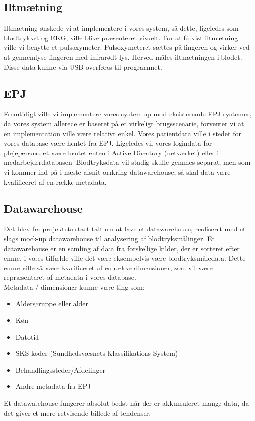 \subsection{Iltmætning}
Iltmætning ønskede vi at implementere i vores system, så dette, ligeledes som blodtrykket og EKG, ville blive præsenteret visuelt. For at få vist iltmætning ville vi benytte et pulsoxymeter. Pulsoxymeteret sættes på fingeren og virker ved at gennemlyse fingeren med infrarødt lys. Herved måles iltmætningen i blodet. Disse data kunne via USB overføres til programmet. 
\subsection{EPJ}
Fremtidigt ville vi implementere vores system op mod eksisterende EPJ systemer, da vores system allerede er baseret på et virkeligt brugsscenarie, forventer vi at en implementation ville være relativt enkel. Vores patientdata ville i stedet for vores database være hentet fra EPJ.  Ligeledes vil vores logindata for plejepersonalet være hentet enten i Active Directory (netværket) eller i medarbejderdatabasen. Blodtryksdata vil stadig skulle gemmes separat, men som vi kommer ind på i næste afsnit omkring datawarehouse, så skal data være kvalificeret af en række metadata.
\subsection{Datawarehouse}
Det blev fra projektets start talt om at lave et datawarehouse, realiseret med et slags mock-up datawarehouse til analysering af blodtryksmålinger. Et datawarehouse er en samling af data fra forskellige kilder, der er sorteret efter emne, i vores tilfælde ville det være eksempelvis være blodtryksmåledata. Dette emne ville så være kvalificeret af en række dimensioner, som vil være repræsenteret af metadata i vores database.\\ 
Metadata / dimensioner kunne være ting som:
\begin{itemize}
\item Aldersgruppe eller alder
\item Køn
\item Datotid
\item SKS-koder (Sundhedsvæsnets Klassifikations System)
\item Behandlingssteder/Afdelinger
\item Andre metadata fra EPJ
\end{itemize}
Et datawarehouse fungerer absolut bedst når der er akkumuleret mange data, da det giver et mere retvisende billede af tendenser. 
